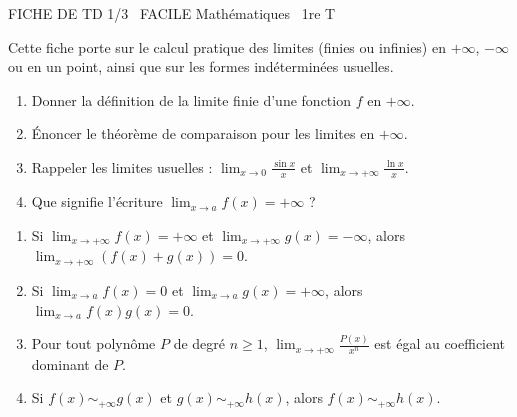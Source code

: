 \documentclass[11pt]{article}
\begin{document}
\begin{tcolorbox}[enhanced,colback=popink,colframe=popink,arc=10pt,boxrule=0pt,left=12pt,right=12pt,top=9pt,bottom=9pt]
{\color{white}\popxbold\small FICHE DE TD 1/3 \textbullet\ FACILE \hfill Mathématiques \textbullet\ 1re T\par}
\end{tcolorbox}
\vspace{4pt}
Cette fiche porte sur le calcul pratique des limites (finies ou infinies) en $+\infty$, $-\infty$ ou en un point, ainsi que sur les formes indéterminées usuelles.

\begin{exercice}
\begin{enumerate}
    \item Donner la définition de la limite finie d'une fonction $f$ en $+\infty$.
    \item Énoncer le théorème de comparaison pour les limites en $+\infty$.
    \item Rappeler les limites usuelles : $\lim_{x\to 0}\frac{\sin x}{x}$ et $\lim_{x\to +\infty}\frac{\ln x}{x}$.
    \item Que signifie l'écriture $\lim_{x\to a}f(x)=+\infty$ ?
\end{enumerate}
\end{exercice}

\begin{exercice}
\begin{enumerate}
    \item Si $\lim_{x\to +\infty}f(x)=+\infty$ et $\lim_{x\to +\infty}g(x)=-\infty$, alors $\lim_{x\to +\infty}(f(x)+g(x))=0$.
    \item Si $\lim_{x\to a}f(x)=0$ et $\lim_{x\to a}g(x)=+\infty$, alors $\lim_{x\to a}f(x)g(x)=0$.
    \item Pour tout polynôme $P$ de degré $n\ge 1$, $\lim_{x\to +\infty}\frac{P(x)}{x^n}$ est égal au coefficient dominant de $P$.
    \item Si $f(x)\sim_{+\infty} g(x)$ et $g(x)\sim_{+\infty} h(x)$, alors $f(x)\sim_{+\infty} h(x)$.
\end{enumerate}
\end{exercice}
\end{document}
